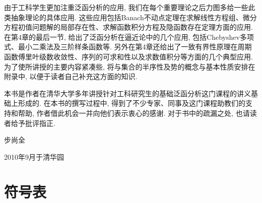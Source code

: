 \documentclass[openany]{ctexbook}
\theoremstyle{kaiti}
\theoremstyle{normal}
\begin{document}
由于工科学生更加注重泛函分析的应用, 我们在每个重要理论之后力图多给一些此类抽象理论的具体应用. 这些应用包括Banach不动点定理在求解线性方程组、微分方程初值问题解的局部存在性、求解函数积分方程及隐函数存在定理方面的应用. 在第4章的最后一节, 给出了泛函分析在逼近论中的几个应用, 包括Chebyshev多项式、最小二乘法及三阶样条函数等. 另外在第4章还给出了一致有界性原理在周期函数傅里叶级数收敛性、序列的可求和性以及求数值积分等方面的几个典型应用. 为了使所讲授的主要内容紧凑些, 将与集合的半序性及势的概念与基本性质安排在附录中, 以便于读者自己补充这方面的知识.

本书是作者在清华大学多年讲授针对工科研究生的基础泛函分析这门课程的讲义基础上形成的. 在本书的撰写过程中, 得到了不少专家、同事及这门课程助教们的支持和帮助, 作者借此机会一并向他们表示衷心的感谢. 对于书中的疏漏之处, 也请读者给予批评指正.

\vspace*{0.5cm}

\hfill {\kaishu 步尚全}

\hfill 2010年9月于清华园

\chapter*{符号表}
\end{document}
